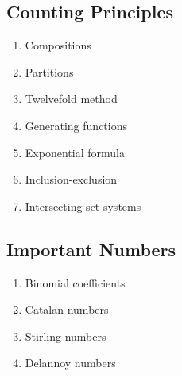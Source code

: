 \documentclass{article}
\begin{document}
\subsection{Counting Principles}
  \begin{enumerate}
    \item Compositions
    \item Partitions
    \item Twelvefold method
    \item Generating functions
    \item Exponential formula 
    \item Inclusion-exclusion
    \item Intersecting set systems
  \end{enumerate}

\subsection{Important Numbers}
  \begin{enumerate}
    \item Binomial coefficients
    \item Catalan numbers
    \item Stirling numbers
    \item Delannoy numbers
  \end{enumerate}
\end{document}
